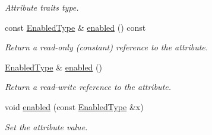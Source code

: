 \begin{DoxyCompactItemize}
\begin{DoxyCompactList}\small\item\em Attribute traits type. \item\end{DoxyCompactList}\item 
const \hyperlink{classopenstack_1_1xml_1_1BackupSchedule_a4a4b5000949fa636b9d7fc6f4ca4250b}{EnabledType} \& \hyperlink{classopenstack_1_1xml_1_1BackupSchedule_a1bda98267af54befc176f1f31944fc36}{enabled} () const 
\begin{DoxyCompactList}\small\item\em Return a read-\/only (constant) reference to the attribute. \item\end{DoxyCompactList}\item 
\hyperlink{classopenstack_1_1xml_1_1BackupSchedule_a4a4b5000949fa636b9d7fc6f4ca4250b}{EnabledType} \& \hyperlink{classopenstack_1_1xml_1_1BackupSchedule_a8e97f3d98c5bab15505aa1e56fd085e7}{enabled} ()
\begin{DoxyCompactList}\small\item\em Return a read-\/write reference to the attribute. \item\end{DoxyCompactList}\item 
void \hyperlink{classopenstack_1_1xml_1_1BackupSchedule_acd8895151709db3da4d072924292e277}{enabled} (const \hyperlink{classopenstack_1_1xml_1_1BackupSchedule_a4a4b5000949fa636b9d7fc6f4ca4250b}{EnabledType} \&x)
\begin{DoxyCompactList}\small\item\em Set the attribute value. \item\end{DoxyCompactList}\end{DoxyCompactItemize}
